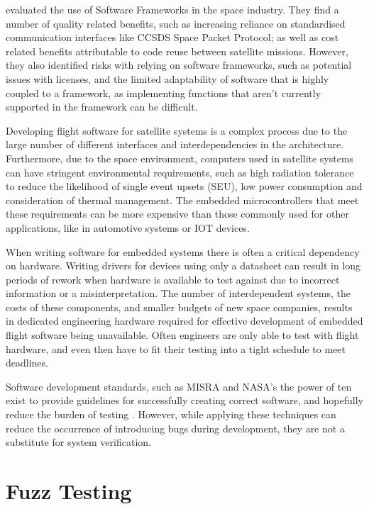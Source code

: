 \documentclass[../report.tex]{subfiles}
\begin{document}
\citet{Farges_2022} evaluated the use of Software Frameworks in the space
industry. They find a number of quality related benefits, such as increasing
reliance on standardised communication interfaces like CCSDS Space Packet
Protocol; as well as cost related benefits attributable to code reuse between
satellite missions. However, they also identified risks with relying on software
frameworks, such as potential issues with licenses, and the limited
adaptability of software that is highly coupled to a framework, as implementing
functions that aren't currently supported in the framework can be difficult.

Developing flight software for satellite systems is a complex process due to
the large number of different interfaces and interdependencies in the
architecture. Furthermore, due to the space environment, computers used in
satellite systems can have stringent environmental requirements, such as high
radiation tolerance to reduce the likelihood of single event upsets (SEU), low
power consumption and consideration of thermal management. The embedded
microcontrollers that meet these requirements can be more expensive than those
commonly used for other applications, like in automotive systems or IOT devices.

When writing software for embedded systems there is often a critical dependency
on hardware. Writing drivers for devices using only a datasheet can result in
long periods of rework when hardware is available to test against due to
incorrect information or a misinterpretation. The number of interdependent
systems, the costs of these components, and smaller budgets of new space
companies, results in dedicated engineering hardware required for effective
development of embedded flight software being unavailable. Often engineers are
only able to test with flight hardware, and even then have to fit their
testing into a tight schedule to meet deadlines.

Software development standards, such as MISRA and NASA's the power of ten exist
to provide guidelines for successfully creating correct software, and hopefully
reduce the burden of testing \citep{NASA_10}. However, while applying these
techniques can reduce the occurrence of introducing bugs during development,
they are not a substitute for system verification.

\section{Fuzz Testing} \label{sec:lit-rev:fuzz}
\end{document}
